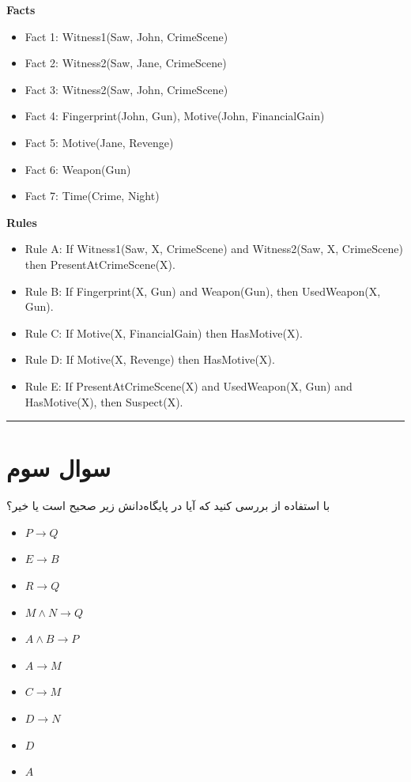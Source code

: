 \documentclass[a4paper,10pt]{article}
\begin{document}
\begin{latin}
\textbf{Facts}
\begin{itemize}
	\item Fact 1: Witness1(Saw, John, CrimeScene)
	\item Fact 2: Witness2(Saw, Jane, CrimeScene)
	\item Fact 3: Witness2(Saw, John, CrimeScene)
	\item Fact 4: Fingerprint(John, Gun), Motive(John, FinancialGain)
	\item Fact 5: Motive(Jane, Revenge)
	\item Fact 6: Weapon(Gun)
	\item Fact 7: Time(Crime, Night)
\end{itemize}

\textbf{Rules}
\begin{itemize}
	\item Rule A: If Witness1(Saw, X, CrimeScene) and Witness2(Saw, X, CrimeScene) 
	then PresentAtCrimeScene(X).
	\item Rule B: If Fingerprint(X, Gun) and Weapon(Gun), then UsedWeapon(X, Gun).
	\item Rule C: If Motive(X, FinancialGain) then HasMotive(X).
	\item Rule D: If Motive(X, Revenge) then HasMotive(X).
	\item Rule E: If PresentAtCrimeScene(X) and UsedWeapon(X, Gun) and HasMotive(X), then Suspect(X).
\end{itemize}
\end{latin}
\textcolor{AccentCyan}{\rule{\linewidth}{0.4pt}}
\section{\textcolor{AccentGold}{سوال سوم}}
با استفاده از  بررسی کنید که آیا  در پایگاه‌دانش زیر صحیح است یا خیر؟
\begin{latin}
\begin{itemize}
	\item ${P} \rightarrow {Q}$
	\item ${E} \rightarrow {B}$
	\item ${R} \rightarrow {Q}$
	\item ${M} \land {N} \rightarrow {Q}$
	\item ${A} \land {B} \rightarrow {P}$
	\item ${A} \rightarrow {M}$
	\item ${C} \rightarrow {M}$
	\item ${D} \rightarrow {N}$
	\item ${D}$
	\item ${A}$
\end{itemize}
\end{latin}
\end{document}
